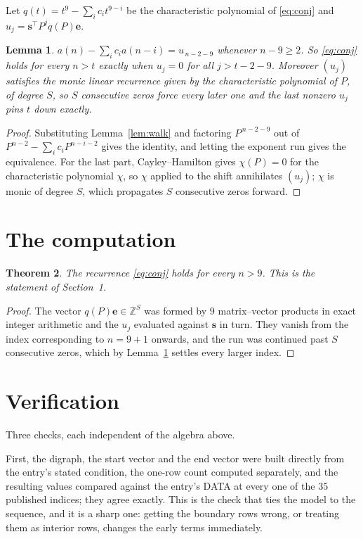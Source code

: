 \documentclass[11pt,a4paper]{article}
\theoremstyle{plain}
\newtheorem{theorem}{Theorem}
\newtheorem{lemma}[theorem]{Lemma}
\theoremstyle{definition}
\begin{document}
Let $q(t)=t^{9}-\sum_i c_i t^{9-i}$ be the characteristic polynomial of
\eqref{eq:conj} and $u_j=\mathbf{s}^{\!\top}P^{j}q(P)\mathbf{e}$.

\begin{lemma}\label{lem:crit}
$a(n)-\sum_i c_i a(n-i)=u_{\,n-2-9}$ whenever $n-9\ge2$. So \eqref{eq:conj}
holds for every $n>t$ exactly when $u_j=0$ for all $j>t-2-9$. Moreover $(u_j)$
satisfies the monic linear recurrence given by the characteristic polynomial of $P$, of
degree $S$, so $S$ consecutive zeros force every later one and the last nonzero $u_j$ pins
$t$ down exactly.
\end{lemma}

\begin{proof}
Substituting Lemma~\ref{lem:walk} and factoring $P^{\,n-2-9}$ out of
$P^{n-2}-\sum_i c_i P^{n-i-2}$ gives the identity, and letting the exponent run gives the
equivalence. For the last part, Cayley--Hamilton gives $\chi(P)=0$ for the characteristic
polynomial $\chi$, so $\chi$ applied to the shift annihilates $(u_j)$; $\chi$ is monic of
degree $S$, which propagates $S$ consecutive zeros forward.
\end{proof}

\section{The computation}

\begin{theorem}
The recurrence \eqref{eq:conj} holds for every $n>9$. This is the statement of
Section~1.
\end{theorem}

\begin{proof}
The vector $q(P)\mathbf{e}\in\mathbb{Z}^{S}$ was formed by $9$ matrix--vector
products in exact integer arithmetic and the $u_j$ evaluated against $\mathbf{s}$ in turn.
They vanish from the index corresponding to $n=9+1$ onwards, and the run was continued
past $S$ consecutive zeros, which by Lemma~\ref{lem:crit} settles every larger index.
\end{proof}

\section{Verification}

Three checks, each independent of the algebra above.

First, the digraph, the start vector and the end vector were built directly from the
entry's stated condition, the one-row count computed separately, and the resulting values
compared against the entry's DATA at every one of the $35$ published indices; they
agree exactly. This is the check that ties the model to the sequence, and it is a sharp one:
getting the boundary rows wrong, or treating them as interior rows, changes the early terms
immediately.
\end{document}
